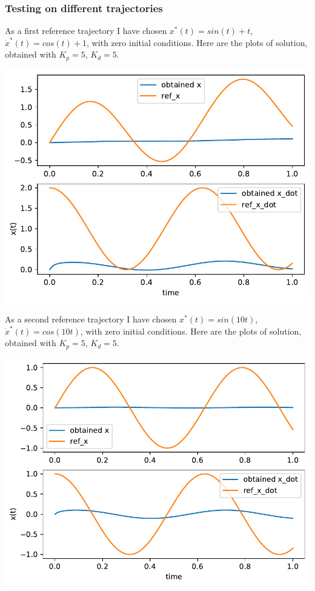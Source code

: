 \documentclass[a4paper,12pt]{article}
\begin{document}
        \subsubsection*{Testing on different trajectories}
            As a first reference trajectory I have chosen $x^*(t)=sin(t) + t$, 
            $\dot{x}^*(t) = cos(t)+1$, with zero initial conditions. Here are the plots 
            of solution, obtained with $K_p = 5$, $K_d = 5$.
            \begin{center}
                \includegraphics[width = 0.8\linewidth]{2a_tr1.pdf}
            \end{center}
            As a second reference trajectory I have chosen $x^*(t)=sin(10t)$, 
            $\dot{x}^*(t) = cos(10t)$, with zero initial conditions. Here are the plots 
            of solution, obtained with $K_p = 5$, $K_d = 5$.
            \begin{center}
                \includegraphics[width = 0.8\linewidth]{2a_tr2.pdf}
            \end{center}
\end{document}
